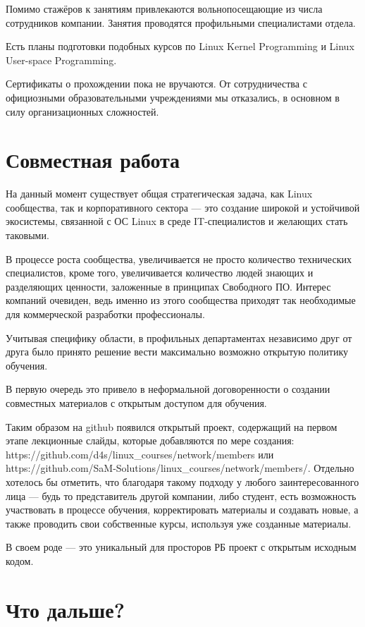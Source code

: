 \documentclass[10pt, a5paper]{article}
\begin{document}
Помимо стажёров к занятиям привлекаются вольнопосещающие из числа сотрудников компании. Занятия проводятся профильными специалистами отдела.

Есть планы подготовки подобных курсов по Linux Kernel Programming и Linux User-space Programming.

Сертификаты о прохождении пока не вручаются. От сотрудничества с официозными образовательными учреждениями мы отказались, в основном в силу организационных сложностей.

\section{Совместная работа}

На данный момент существует общая стратегическая задача, как Linux сообщества, так и корпоративного сектора --- это создание широкой и устойчивой экосистемы, связанной с ОС Linux в среде IT-специалистов и желающих стать таковыми.

В процессе роста сообщества, увеличивается не просто количество технических специалистов, кроме того, увеличивается количество людей знающих и разделяющих ценности, заложенные в принципах Свободного ПО.
Интерес компаний очевиден, ведь  именно из этого сообщества приходят так необходимые для коммерческой разработки профессионалы.

Учитывая специфику области, в профильных департаментах независимо друг от друга было принято решение вести максимально возможно открытую политику обучения.

В первую очередь это привело в неформальной договоренности о создании совместных материалов с открытым доступом для обучения.

Таким образом на github появился открытый проект, содержащий на первом этапе лекционные слайды, которые добавляются по мере создания: https://github.com/d4s/linux\_courses/network/members или https://github.com/SaM-Solutions/linux\_courses/network/members/. Отдельно хотелось бы отметить, что благодаря такому подходу у любого заинтересованного лица --- будь то представитель другой компании, либо студент, есть возможность участвовать в процессе обучения, корректировать материалы и создавать новые, а также проводить свои собственные курсы, используя уже созданные материалы.

В своем роде --- это уникальный для просторов РБ проект с открытым исходным кодом.

\section{Что дальше?}
\end{document}
